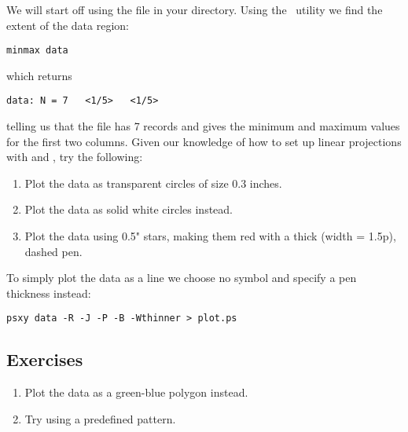 \documentclass[11pt]{report}
\begin{document}
We will start off using the file  in your directory.
Using the \GMT\ utility  we find the extent of the
data region:

{\small\begin{verbatim}
minmax data
\end{verbatim}
}

\noindent
which returns

{\small\begin{verbatim}
data: N = 7   <1/5>   <1/5>
\end{verbatim}
}

\noindent
telling us that the file  has 7 records and gives the
minimum and maximum values for the first two columns.  Given our
knowledge of how to set up linear projections with  and ,
try the following:

\begin{enumerate}

\item Plot the data as transparent circles of size 0.3 inches.

\item Plot the data as solid white circles instead.

\item Plot the data using 0.5" stars, making them red with a thick (width = 1.5p),
dashed pen.

\end{enumerate}

To simply plot the data as a line we choose no symbol and specify a pen thickness instead:

{\small\begin{verbatim} 
psxy data -R -J -P -B -Wthinner > plot.ps
\end{verbatim}
}

\subsection{Exercises}

\begin{enumerate}

\item Plot the data as a green-blue polygon instead.

\item Try using a predefined pattern.

\end{enumerate}
\end{document}
